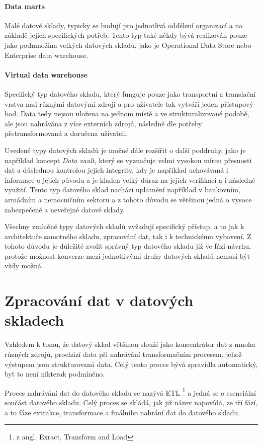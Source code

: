 \documentclass[
  digital,     %
  twoside,     %
  lof,         %
  lot,         %
]{fithesis4}
\begin{document}
\paragraph{Data marts}
Malé datové sklady, typicky se budují pro jednotlivá oddělení organizací a na základě jejich specifických potřeb. Tento typ také někdy bývá realizován pouze jako podmnožina velkých datových skladů, jako je Operational Data Store nebo Enterprise data warehouse.\parencite{Inmon2021}
\paragraph{Virtual data warehouse}
Specifický typ datového skladu, který funguje pouze jako transportní a translační vrstva nad různými datovými zdroji a pro uživatele tak vytváří jeden přístupový bod. Data tedy nejsou uložena na jednom místě a ve strukturalizované podobě, ale jsou nahrávána z více externích zdrojů, následně dle potřeby přetransformovaná a doručena uživateli. 

\vspace{5mm}
Uvedené typy datových skladů je možné dále rozšířit o další poddruhy, jako je například koncept \emph{Data vault}, který se vyznačuje velmi vysokou mírou přesnosti dat a důslednou kontrolou jejich integrity, kdy je například uchovávaná i informace o jejich původu a je kladen velký důraz na jejich verifikaci a i následné využití. Tento typ datového sklad nachází uplatnění například v bankovním, armádním a nemocničním sektoru a z tohoto důvodu se většinou jedná o vysoce zabezpečené a neveřejné datové sklady.\parencite{Inmon2021}

Všechny zmíněné typy datových skladů vyžadují specifický přístup, a to jak
k architektuře samotného skladu, zpracování dat, tak i k technickému vybavení. Z tohoto
důvodu je důležité zvolit správný typ datového skladu již ve fázi návrhu, protože
možnost konverze mezi jednotlivými druhy datových skladů nemusí být vždy možná.

\section{Zpracování dat v datových skladech}
Vzhledem k tomu, že datový sklad většinou slouží jako koncentrátor dat z mnoha různých zdrojů, prochází data při nahrávání transformačním procesem, jehož výstupem jsou strukturovaná data. Celý tento proces bývá zpravidla automatický, byť to není nikterak podmíněno.

Proces nahrávání dat do datového skladu se nazývá ETL \footnote{z angl. Exract, Transform and Load} a jedná se o esenciální součást datového skladu. Celý proces se skládá, jak již název napovídá, ze tří fází, a to fáze extrakce, transformace a finálního nahrání dat do datového skladu.
\end{document}
